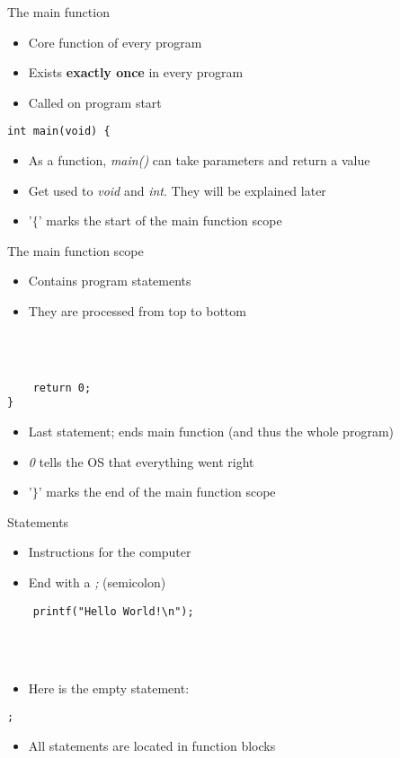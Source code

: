 \begin{frame}[fragile]{The main function}
	\begin{itemize}
		\item Core function of every program
		\item Exists \textbf{exactly once} in every program
		\item Called on program start
	\end{itemize}
	\begin{lstlisting}
int main(void) {
\end{lstlisting}
	\begin{itemize}
		\item As a function, \textit{main()} can take parameters and return a value
		\item Get used to \textit{void} and \textit{int}. They will be explained later
		\item '$\lbrace$' marks the start of the main function scope
	\end{itemize}
\end{frame}
\begin{frame}[fragile]{The main function scope}
	\begin{itemize}
		\item Contains program statements
		\item They are processed from top to bottom
	\end{itemize} \ \\
	\ \\
	\begin{lstlisting}
	return 0;
}
\end{lstlisting}
	\begin{itemize}
		\item Last statement; ends main function (and thus the whole program)
		\item \textit{0} tells the OS that everything went right
		\item '$\rbrace$' marks the end of the main function scope
	\end{itemize}
\end{frame}
\begin{frame}[fragile]{Statements}
	\begin{itemize}
		\item Instructions for the computer
		\item End with a \textit{;} (semicolon)
	\end{itemize}
	\begin{lstlisting}
	printf("Hello World!\n");
\end{lstlisting} \ \\ \ \\
	\begin{itemize}
		\item Here is the empty statement:
	\end{itemize}
	\begin{lstlisting}[numbers=none]
	;
\end{lstlisting}
	\begin{itemize}
		\item All statements are located in function blocks
	\end{itemize}
\end{frame}
